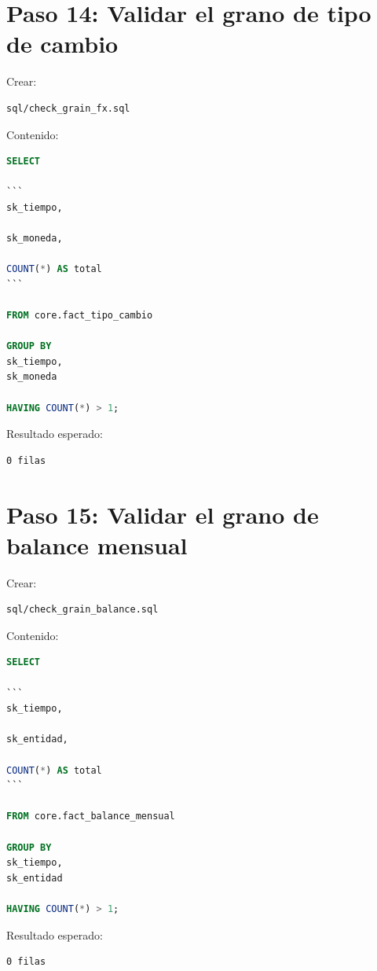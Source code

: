 \section{Paso 14: Validar el grano de tipo de cambio}

Crear:

\begin{verbatim}
sql/check_grain_fx.sql
\end{verbatim}

Contenido:

\begin{lstlisting}[language=SQL]
SELECT

```
sk_tiempo,

sk_moneda,

COUNT(*) AS total
```

FROM core.fact_tipo_cambio

GROUP BY
sk_tiempo,
sk_moneda

HAVING COUNT(*) > 1;
\end{lstlisting}

Resultado esperado:

\begin{verbatim}
0 filas
\end{verbatim}

\section{Paso 15: Validar el grano de balance mensual}

Crear:

\begin{verbatim}
sql/check_grain_balance.sql
\end{verbatim}

Contenido:

\begin{lstlisting}[language=SQL]
SELECT

```
sk_tiempo,

sk_entidad,

COUNT(*) AS total
```

FROM core.fact_balance_mensual

GROUP BY
sk_tiempo,
sk_entidad

HAVING COUNT(*) > 1;
\end{lstlisting}

Resultado esperado:

\begin{verbatim}
0 filas
\end{verbatim}


